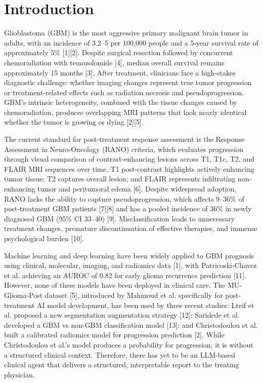 \documentclass[letterpaper, 10pt, conference]{IEEEtran}
\begin{document}
\section{Introduction}
Glioblastoma (GBM) is the most aggressive primary malignant brain tumor in adults, with an incidence of 3.2--5 per
100,000 people and a 5-year survival rate of approximately 5\% [1][2]. Despite surgical resection followed by
concurrent chemoradiation with temozolomide [4], median overall survival remains approximately 15 months [3]. After
treatment, clinicians face a high-stakes diagnostic challenge: whether imaging changes represent true tumor
progression or treatment-related effects such as radiation necrosis and pseudoprogression. GBM's intrinsic
heterogeneity, combined with the tissue changes caused by chemoradiation, produces overlapping MRI patterns that look
nearly identical whether the tumor is growing or dying [2][5].

The current standard for post-treatment response assessment is the Response Assessment in Neuro-Oncology (RANO)
criteria, which evaluates progression through visual comparison of contrast-enhancing lesions across T1, T1c, T2, and
FLAIR MRI sequences over time. T1 post-contrast highlights actively enhancing tumor tissue; T2 captures overall
lesion; and FLAIR represents infiltrating non-enhancing tumor and peritumoral edema [6]. Despite widespread adoption,
RANO lacks the ability to capture pseudoprogression, which affects 9--36\% of post-treatment GBM patients [7][8] and
has a pooled incidence of 36\% in newly diagnosed GBM (95\% CI 33--40) [9]. Misclassification leads to unnecessary
treatment changes, premature discontinuation of effective therapies, and immense psychological burden [10].

Machine learning and deep learning have been widely applied to GBM prognosis using clinical, molecular, imaging, and
radiomics data [1], with Patricoski-Chavez et al. achieving an AUROC of 0.82 for early glioma recurrence prediction
[11]. However, none of these models have been deployed in clinical care. The MU-Glioma-Post dataset [5], introduced
by Mahmoud et al. specifically for post-treatment AI model development, has been used by three recent studies: Lteif
et al. proposed a new segmentation augmentation strategy [12]; Saridede et al. developed a GBM vs non-GBM
classification model [13]; and Christodoulou et al. built a calibrated radiomics model for progression prediction
[2]. While Christodoulou et al.'s model produces a probability for progression, it is without a structured clinical
context. Therefore, there has yet to be an LLM-based clinical agent that delivers a structured, interpretable report
to the treating physician.
\end{document}
